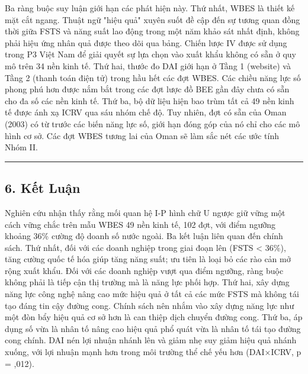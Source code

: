 \documentclass[12pt,a4paper]{article}
\begin{document}
Ba ràng buộc suy luận giới hạn các phát hiện này. Thứ nhất, WBES là
thiết kế mặt cắt ngang. Thuật ngữ "hiệu quả" xuyên suốt đề cập đến sự
tương quan đồng thời giữa FSTS và năng suất lao động trong một năm khảo
sát nhất định, không phải hiệu ứng nhân quả được theo dõi qua bảng.
Chiến lược IV được sử dụng trong P3 Việt Nam để giải quyết sự lựa chọn
vào xuất khẩu không có sẵn ở quy mô trên 34 nền kinh tế. Thứ hai, thước
đo DAI giới hạn ở Tầng 1 (website) và Tầng 2 (thanh toán điện tử) trong
hầu hết các đợt WBES. Các chiều năng lực số phong phú hơn được nắm bắt
trong các đợt lược đồ BEE gần đây chưa có sẵn cho đa số các nền kinh tế.
Thứ ba, bộ dữ liệu hiện bao trùm tất cả 49 nền kinh tế được ánh xạ ICRV
qua sáu nhóm chế độ. Tuy nhiên, đợt có sẵn của Oman (2003) có từ trước
các biến năng lực số, giới hạn đóng góp của nó chỉ cho các mô hình cơ
sở. Các đợt WBES tương lai của Oman sẽ làm sắc nét các ước tính Nhóm II.

\begin{center}\rule{0.5\linewidth}{0.5pt}\end{center}

\hypertarget{6-kux1ebft-luux1eadn}{%
\subsection{6. Kết Luận}\label{6-kux1ebft-luux1eadn}}

Nghiên cứu nhận thấy rằng mối quan hệ I-P hình chữ U ngược giữ vững một
cách vững chắc trên mẫu WBES 49 nền kinh tế, 102 đợt, với điểm ngưỡng
khoảng 36\% cường độ doanh số nước ngoài. Ba kết luận liên quan đến
chính sách. Thứ nhất, đối với các doanh nghiệp trong giai đoạn lên (FSTS
\textless{} 36\%), tăng cường quốc tế hóa giúp tăng năng suất; ưu tiên
là loại bỏ các rào cản mở rộng xuất khẩu. Đối với các doanh nghiệp vượt
qua điểm ngưỡng, ràng buộc không phải là tiếp cận thị trường mà là năng
lực phối hợp. Thứ hai, xây dựng năng lực công nghệ nâng cao mức hiệu quả
ở tất cả các mức FSTS mà không tái tạo đáng tin cậy đường cong. Chính
sách nên nhắm vào xây dựng năng lực như một đòn bẩy hiệu quả cơ sở hơn
là can thiệp dịch chuyển đường cong. Thứ ba, áp dụng số vừa là nhân tố
nâng cao hiệu quả phổ quát vừa là nhân tố tái tạo đường cong chính. DAI
nén lợi nhuận nhánh lên và giảm nhẹ suy giảm hiệu quả nhánh xuống, với
lợi nhuận mạnh hơn trong môi trường thể chế yếu hơn (DAI×ICRV, p =
,012).
\end{document}
